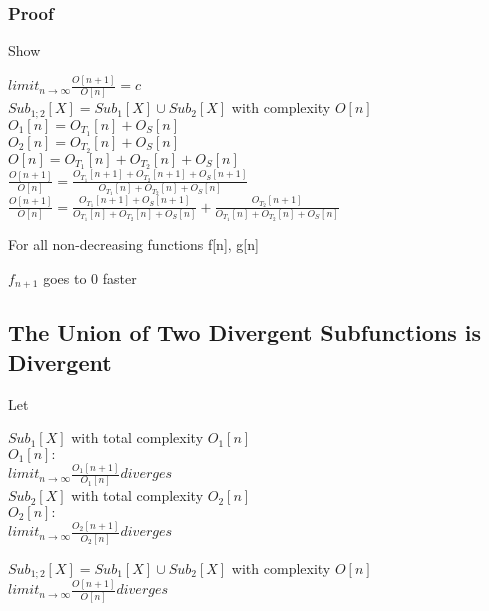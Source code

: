 \documentclass[11pt]{article}
\begin{document}
\subsubsection{Proof}
Show
\begin{center}
$
limit_{n \rightarrow \infty}\frac{O[n+1]}{O[n]} = c
$
\\ \vspace{4mm}
$
Sub_{1;2}[X] = Sub_1[X] \cup Sub_2[X]$ with complexity $O[n]
$
\\ \vspace{2mm}
$
O_1[n] = O_{T_1}[n] + O_S[n]
$
\\ \vspace{2mm}
$
O_2[n] = O_{T_2}[n] + O_S[n]
$
\\ \vspace{2mm}
$
O[n] = O_{T_1}[n] + O_{T_2}[n] + O_S[n]
$
\\ \vspace{8mm}
$
\frac{O[n+1]}{O[n]} = \frac{O_{T_1}[n+1] + O_{T_2}[n+1] + O_S[n+1]}{O_{T_1}[n] + O_{T_2}[n] + O_S[n]}
$
\\ \vspace{2mm}
$
\frac{O[n+1]}{O[n]} = \frac{O_{T_1}[n+1] + O_S[n+1]}{O_{T_1}[n] + O_{T_2}[n] + O_S[n]} + \frac{O_{T_2}[n+1]}{O_{T_1}[n] + O_{T_2}[n] + O_S[n]}
$
\end{center}
\vspace{8mm}
For all non-decreasing functions f[n], g[n]
\begin{center}
$f_{n+1}$ goes to 0 faster
\end{center}



\subsection{The Union of Two Divergent Subfunctions is Divergent}
Let
\begin{center}
$
Sub_1[X]$ with total complexity $O_1[n]$
\\ \vspace{2mm}
$
O_1[n]:
$
\\ \vspace{2mm}
$
limit_{n \rightarrow \infty}\frac{O_1[n+1]}{O_1[n]} diverges
$
\\ \vspace{6mm}
$
Sub_2[X]$ with total complexity $O_2[n]$
\\ \vspace{2mm}
$
O_2[n]:
$
\\ \vspace{2mm}
$
limit_{n \rightarrow \infty}\frac{O_2[n+1]}{O_2[n]} diverges
$
\end{center}
\vspace{1mm}
\begin{center}
$
Sub_{1;2}[X] = Sub_1[X] \cup Sub_2[X]$ with complexity $O[n]
$
\\ \vspace{2mm}
$
limit_{n \rightarrow \infty}\frac{O[n+1]}{O[n]} diverges
$
\end{center}
\end{document}
